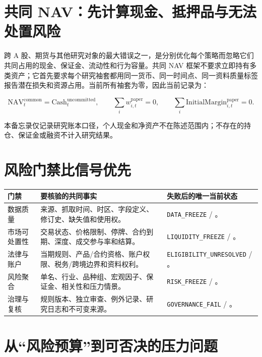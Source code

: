 \section{共同 NAV：先计算现金、抵押品与无法处置风险}

跨 A 股、期货与其他研究对象的最大错误之一，是分别优化每个策略而忽略它们共同占用的现金、保证金、流动性和行为容量。共同 NAV 框架不要求立即持有多类资产；它首先要求每个研究袖套都用同一货币、同一时间点、同一资料质量标签报告潜在损失和资源占用。当前所有袖套为零，因此当前记录为：

\[
\mathrm{NAV}^{\mathrm{common}}_t=\mathrm{Cash}^{\mathrm{uncommitted}}_t,\qquad
\sum_i w^{\mathrm{paper}}_{i,t}=0,\qquad
\sum_i \mathrm{InitialMargin}^{\mathrm{paper}}_{i,t}=0.
\]

本备忘录仅记录研究账本口径，个人现金和净资产不在陈述范围内；不存在的持仓、保证金或融资不计入研究结果。

\section{风险门禁比信号优先}

\begin{exhibitbox}
\small
\begin{tabularx}{\exhibitboxwidth}{L{2.65cm}X L{3.75cm}}
\toprule
\textbf{门禁} & \textbf{要核验的共同事实} & \textbf{失败后的唯一当前状态} \\
\midrule
数据质量 & 来源、抓取时间、时区、字段定义、修订史、缺失值和使用权。 & \texttt{DATA\_FREEZE} / \qzero{}。 \\
市场可处置性 & 交易状态、价格限制、停牌、合约到期、深度、成交参与率和结算。 & \texttt{LIQUIDITY\_FREEZE} / \qzero{}。 \\
法律与账户 & 当期规则、产品/合约资格、账户权限、税务/跨境边界和资料权利。 & {\scriptsize\texttt{ELIGIBILITY\_UNRESOLVED}} / \qzero{}。 \\
风险聚合 & 单名、行业、品种组、宏观因子、保证金、相关性和压力情景。 & \texttt{RISK\_FREEZE} / \qzero{}。 \\
治理与复核 & 规则版本、独立审查、例外记录、研究日志和不可变来源。 & \texttt{GOVERNANCE\_FAIL} / \qzero{}。 \\
\bottomrule
\end{tabularx}
\end{exhibitbox}

\section{从“风险预算”到可否决的压力问题}

